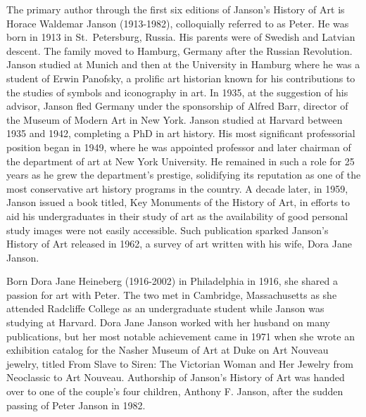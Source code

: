 \documentclass[
  letterpaper,
  DIV=11,
  numbers=noendperiod]{scrreprt}
\begin{document}
The primary author through the first six editions of Janson's History of
Art is Horace Waldemar Janson (1913-1982), colloquially referred to as
Peter. He was born in 1913 in St.~Petersburg, Russia. His parents were
of Swedish and Latvian descent. The family moved to Hamburg, Germany
after the Russian Revolution. Janson studied at Munich and then at the
University in Hamburg where he was a student of Erwin Panofsky, a
prolific art historian known for his contributions to the studies of
symbols and iconography in art. In 1935, at the suggestion of his
advisor, Janson fled Germany under the sponsorship of Alfred Barr,
director of the Museum of Modern Art in New York. Janson studied at
Harvard between 1935 and 1942, completing a PhD in art history. His most
significant professorial position began in 1949, where he was appointed
professor and later chairman of the department of art at New York
University. He remained in such a role for 25 years as he grew the
department's prestige, solidifying its reputation as one of the most
conservative art history programs in the country. A decade later, in
1959, Janson issued a book titled, Key Monuments of the History of Art,
in efforts to aid his undergraduates in their study of art as the
availability of good personal study images were not easily accessible.
Such publication sparked Janson's History of Art released in 1962, a
survey of art written with his wife, Dora Jane Janson.

\hfill\break
Born Dora Jane Heineberg (1916-2002) in Philadelphia in 1916, she shared
a passion for art with Peter. The two met in Cambridge, Massachusetts as
she attended Radcliffe College as an undergraduate student while Janson
was studying at Harvard. Dora Jane Janson worked with her husband on
many publications, but her most notable achievement came in 1971 when
she wrote an exhibition catalog for the Nasher Museum of Art at Duke on
Art Nouveau jewelry, titled From Slave to Siren: The Victorian Woman and
Her Jewelry from Neoclassic to Art Nouveau. Authorship of Janson's
History of Art was handed over to one of the couple's four children,
Anthony F. Janson, after the sudden passing of Peter Janson in 1982.
\end{document}
